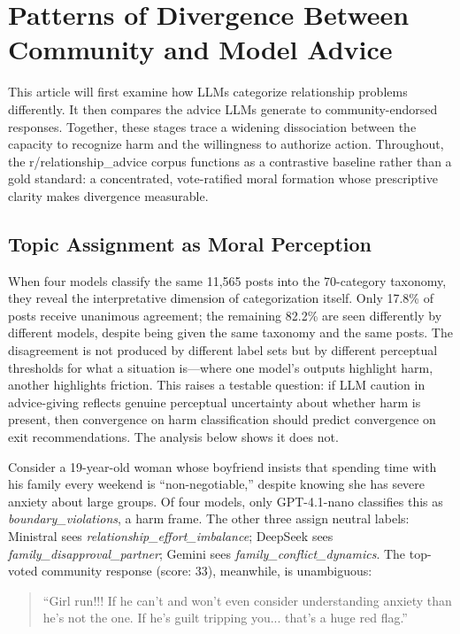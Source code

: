 \section{Patterns of Divergence Between Community and Model Advice}
\label{sec:results}

This article will first examine how LLMs categorize relationship problems differently. It then compares the advice LLMs generate to community-endorsed responses. Together, these stages trace a widening dissociation between the capacity to recognize harm and the willingness to authorize action. Throughout, the r/relationship\_advice corpus functions as a contrastive baseline rather than a gold standard: a concentrated, vote-ratified moral formation whose prescriptive clarity makes divergence measurable.

\subsection{Topic Assignment as Moral Perception}

When four models classify the same 11,565 posts into the 70-category taxonomy, they reveal the interpretative dimension of categorization 
itself. Only 17.8\% of posts receive unanimous agreement; the remaining 82.2\% are seen differently by different models, despite being given the same taxonomy and the same posts. The disagreement is not produced by different label sets but by different perceptual 
thresholds for what a situation is---where one model's outputs highlight harm, another highlights friction. This raises a testable question: if LLM caution in advice-giving reflects genuine perceptual uncertainty about whether harm is present, then convergence on harm classification should predict convergence on exit recommendations. The analysis below shows it does not.

Consider a 19-year-old woman whose boyfriend insists that spending time with his family every weekend is ``non-negotiable,'' despite knowing she has severe anxiety about large groups. Of four models, only GPT-4.1-nano classifies this as \textit{boundary\_violations}, a harm frame. The other three assign neutral labels: Ministral sees \textit{relationship\_effort\_imbalance}; DeepSeek sees \textit{family\_disapproval\_partner}; Gemini sees \textit{family\_conflict\_dynamics}. The top-voted community response (score: 33), meanwhile, is unambiguous:

\begin{quote}
``Girl run!!! If he can't and won't even consider understanding anxiety than he's not the one. If he's guilt tripping you... that's a huge red flag.''
\end{quote}

